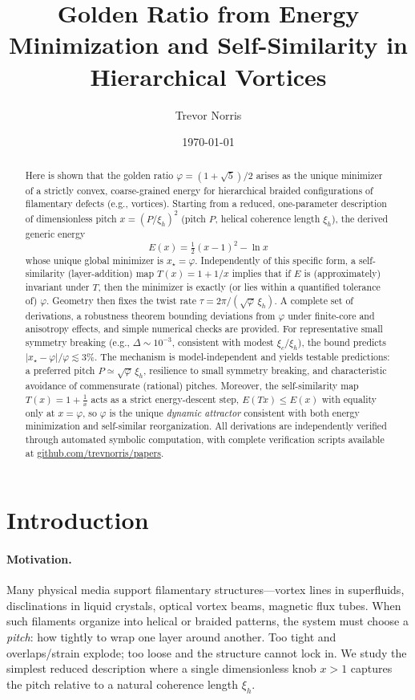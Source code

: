 \documentclass[11pt]{article}
\title{Golden Ratio from Energy Minimization and Self-Similarity in Hierarchical Vortices}
\author{Trevor Norris}
\date{\small \today}
\theoremstyle{remark}
\theoremstyle{definition}
\newcommand{\ph}{\varphi}
\begin{document}
\maketitle

\begin{abstract}
Here is shown that the golden ratio $\ph=(1+\sqrt5)/2$ arises as the unique minimizer of a strictly convex, coarse-grained energy for hierarchical braided configurations of filamentary defects (e.g., vortices). Starting from a reduced, one-parameter description of dimensionless pitch $x=(P/\xi_h)^2$ (pitch $P$, helical coherence length $\xi_h$), the derived generic energy
\[
E(x)=\tfrac12(x-1)^2-\ln x
\]
whose unique global minimizer is $x_\star=\ph$. Independently of this specific form, a self-similarity (layer-addition) map $T(x)=1+1/x$ implies that if $E$ is (approximately) invariant under $T$, then the minimizer is exactly (or lies within a quantified tolerance of) $\ph$. Geometry then fixes the twist rate $\tau=2\pi/(\sqrt{\ph}\,\xi_h)$. A complete set of derivations, a robustness theorem bounding deviations from $\ph$ under finite-core and anisotropy effects, and simple numerical checks are provided. For representative small symmetry breaking (e.g., $\Delta\sim10^{-3}$, consistent with modest $\xi_c/\xi_h$), the bound predicts $|x_\star-\ph|/\ph\lesssim 3\%$. The mechanism is model-independent and yields testable predictions: a preferred pitch $P\simeq\sqrt{\ph}\,\xi_h$, resilience to small symmetry breaking, and characteristic avoidance of commensurate (rational) pitches. Moreover, the self-similarity map $T(x)=1+\tfrac{1}{x}$ acts as a strict energy-descent step, $E(Tx)\le E(x)$ with equality only at $x=\varphi$, so $\varphi$ is the unique \emph{dynamic attractor} consistent with both energy minimization and self-similar reorganization. All derivations are independently verified through automated symbolic computation, with complete verification scripts available at \url{github.com/trevnorris/papers}.
\end{abstract}

\section{Introduction}
\paragraph{Motivation.} Many physical media support filamentary structures---vortex lines in superfluids, disclinations in liquid crystals, optical vortex beams, magnetic flux tubes. When such filaments organize into helical or braided patterns, the system must choose a \emph{pitch}: how tightly to wrap one layer around another. Too tight and overlaps/strain explode; too loose and the structure cannot lock in. We study the simplest reduced description where a single dimensionless knob $x>1$ captures the pitch relative to a natural coherence length $\xi_h$.
\end{document}
